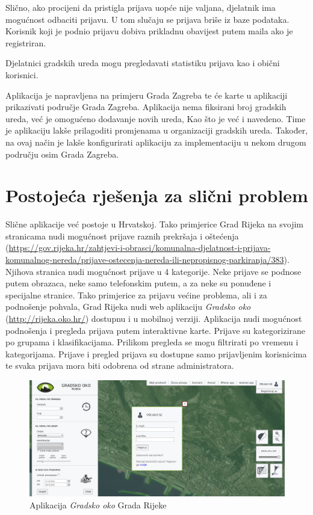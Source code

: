 		Slično, ako procijeni da pristigla prijava uopće nije valjana, djelatnik ima mogućnost odbaciti prijavu. U tom slučaju se prijava briše iz baze podataka. Korisnik koji je podnio prijavu dobiva prikladnu obavijest putem maila ako je registriran.
		
		Djelatnici gradskih ureda mogu pregledavati statistiku prijava kao i obični korisnici.
		
		Aplikacija je napravljena na primjeru Grada Zagreba te će karte u aplikaciji prikazivati područje Grada Zagreba. Aplikacija nema fiksirani broj gradskih ureda, već je omogućeno dodavanje novih ureda, Kao što je već i navedeno. Time je aplikaciju lakše prilagoditi promjenama u organizaciji gradskih ureda. Također, na ovaj način je lakše konfigurirati aplikaciju za implementaciju u nekom drugom području osim Grada Zagreba.
		\eject
		
		\section{Postojeća rješenja za slični problem}
		
			Slične aplikacije već postoje u Hrvatskoj. Tako primjerice Grad Rijeka na svojim stranicama nudi mogućnost prijave raznih prekršaja i oštećenja (\url{https://gov.rijeka.hr/zahtjevi-i-obrasci/komunalna-djelatnost-i-prijava-komunalnog-nereda/prijave-ostecenja-nereda-ili-nepropisnog-parkiranja/383}). Njihova stranica nudi mogućnost prijave u 4 kategorije. Neke prijave se podnose putem obrazaca, neke samo telefonskim putem, a za neke su ponuđene i specijalne stranice. Tako primjerice za prijavu većine problema, ali i za podnošenje pohvala, Grad Rijeka nudi web aplikaciju \textit{Gradsko oko} (\url{http://rijeka.oko.hr/}) dostupnu i u mobilnoj verziji. Aplikacija nudi mogućnost podnošenja i pregleda prijava putem interaktivne karte. Prijave su kategorizirane po grupama i klasifikacijama. Prilikom pregleda se mogu filtrirati po vremenu i kategorijama. Prijave i pregled prijava su dostupne samo prijavljenim korisnicima te svaka prijava mora biti odobrena od strane administratora.
		
		\begin{figure}[H]
			\includegraphics[width=\textwidth]{slike/GradskoOko.PNG}
			\caption{Aplikacija \textit{Gradsko oko} Grada Rijeke}
			\label{fig:gradskooko} %
		\end{figure}
		
